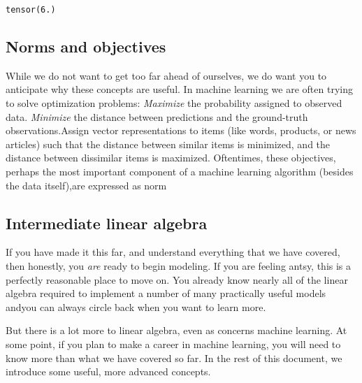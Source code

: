 \documentclass[]{article}
\begin{document}
\begin{verbatim}
tensor(6.)
\end{verbatim}




\subsection{Norms and objectives}

While we do not want to get too far ahead of ourselves, we do want you to anticipate why these concepts are useful. In machine learning we are often trying to solve optimization problems: \textit{Maximize} the probability assigned to observed data. \textit{Minimize} the distance between predictions and the ground-truth observations.Assign vector representations to items (like words, products, or news articles) such that the distance between similar items is minimized, and the distance between dissimilar items is maximized.  Oftentimes, these objectives, perhaps the most important component of a machine learning algorithm (besides the data itself),are expressed as norm

\subsection{Intermediate linear algebra}

If you have made it this far, and understand everything that we have covered, then honestly, you \textit{are} ready to begin modeling. If you are feeling antsy, this is a perfectly reasonable place to move on. You already know nearly all of the linear algebra required to implement a number of many practically useful models andyou can always circle back when you want to learn more.

But there is a lot more to linear algebra, even as concerns machine learning. At some point, if you plan to make a career in machine learning, you will need to know more than what we have covered so far. In the rest of this document, we introduce some useful, more advanced concepts.
\end{document}
